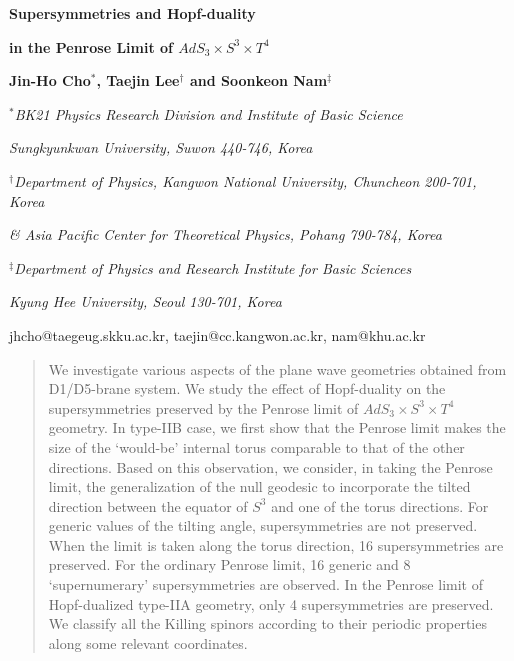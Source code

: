 \documentclass[a4paper,12pt]{article}
\begin{document}
\def\hatt{{\hat t}}
\def\hatx{{\hat x}}
\def\hatth{{\hat \theta}}
\def\hatta{{\hat \tau}}
\def\hatrh{{\hat \rho}}
\def\hatva{{\hat \varphi}}
\def\gsim{\mathrel{\rlap{\lower4pt\hbox{\hskip1pt$\sim$}}
    \raise1pt\hbox{$>$}}}
\def\lsim{\mathrel{\rlap{\lower4pt\hbox{\hskip1pt$\sim$}}
    \raise1pt\hbox{$<$}}}
\def\p{\partial}
\def\nn{\nonumber}
\def\tils{{\tilde s}}
\def\tila{{\tilde a}}
\def\bart{{\bar t}}
\def\barx{{\bar x}}
\def\barh{{\bar \rho}}
\def\np#1#2#3{Nucl. Phys. {\bf B#1} (#2) #3}
\def\pl#1#2#3{Phys. Lett. {\bf B#1} (#2) #3}
\def\prl#1#2#3{Phys. Rev. Lett.{\bf #1} (#2) #3}
\def\pr#1#2#3{Phys. Rev. {\bf D#1} (#2) #3}
\def\ap#1#2#3{Ann. Phys. {\bf #1} (#2) #3}
\def\prep#1#2#3{Phys. Rep. {\bf #1} (#2) #3}
\def\rmp#1#2#3{Rev. Mod. Phys. {\bf #1}}
\def\cmp#1#2#3{Comm. Math. Phys. {\bf #1} (#2) #3}
\def\mpl#1#2#3{Mod. Phys. Lett. {\bf #1} (#2) #3}
\def\cqg#1#2#3{Class. Quant. Grav. {\bf #1} (#2) #3}
\def\jmp#1#2#3{J. Math. Phys. {\bf #1} (#2) #3}
\begin{titlepage}
\bigskip
\rightline{}
\bigskip\bigskip\bigskip\bigskip
   \centerline{\Large \bf {Supersymmetries and Hopf-duality}}
   \bigskip
\centerline{\Large \bf {in the Penrose Limit of $AdS_3\times S^3\times T^4$}}
    \bigskip\bigskip
     \bigskip\bigskip

\centerline{\bf Jin-Ho Cho${}^*$, Taejin Lee${}^\dagger$ and Soonkeon Nam${}^\ddagger$}
\bigskip\bigskip
   \centerline{\em ${}^*$BK21 Physics Research Division and Institute of Basic Science}
\centerline{\em Sungkyunkwan University, 
Suwon 440-746, Korea}
\bigskip
   \centerline{\em ${}^\dagger$Department of Physics, Kangwon National University, 
 Chuncheon 200-701, Korea}
\centerline{\em \& Asia Pacific Center for Theoretical Physics, Pohang 790-784, Korea}
\bigskip
   \centerline{\em ${}^\ddagger$Department of Physics and Research Institute for Basic Sciences}
\centerline{\em Kyung Hee University, 
 Seoul 130-701, Korea}
\bigskip
\centerline{\sf jhcho@taegeug.skku.ac.kr, taejin@cc.kangwon.ac.kr, nam@khu.ac.kr}
    \bigskip\bigskip


\begin{abstract}
We investigate various aspects of the plane wave geometries obtained from D1/D5-brane system.
We study the effect of Hopf-duality on the supersymmetries preserved by the Penrose limit of $AdS_3\times S^3\times T^4$ geometry. In type-IIB case, we first show that the Penrose limit makes the size of the `would-be' internal torus comparable to that of the other directions. Based on this observation, we consider, in taking the Penrose limit, the generalization of the null geodesic to incorporate the tilted direction between the equator of $S^3$ and one of the torus directions. For generic values of the tilting angle, supersymmetries are not preserved. When the limit is taken along the torus direction, 16 supersymmetries are preserved. For the ordinary Penrose limit, 16 generic and 8 `supernumerary' supersymmetries are observed. In the Penrose limit of Hopf-dualized type-IIA geometry, only 4 supersymmetries are preserved. We classify all the Killing spinors according to their periodic properties along some relevant coordinates.
\end{abstract}
    \end{titlepage}
\end{document}
